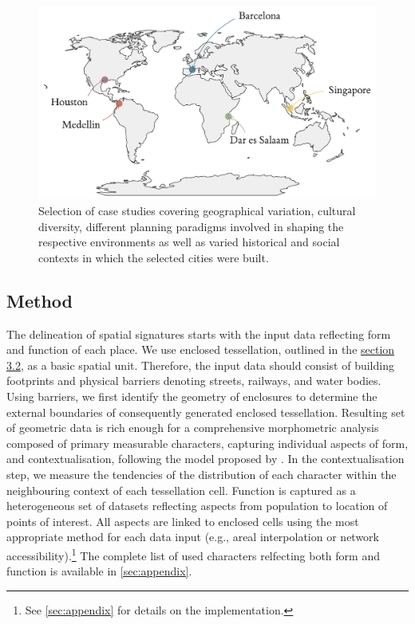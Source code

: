 \begin{figure}
    \includegraphics[width=0.75\linewidth, center]{figures/examples_map.pdf}
    \caption{Selection of case studies covering geographical variation,
    cultural diversity, different planning paradigms involved in shaping the
    respective environments as well as varied historical and social contexts in which the
    selected cities were built.}
    \label{fig:world_map}
\end{figure}

\subsection{Method}



The delineation of spatial signatures starts with the input data reflecting form and
function of each place. We use enclosed tessellation, outlined in the
\hyperref[sec:ssec:ss_et]{section 3.2}, as a basic spatial unit. Therefore, the input
data should consist of building footprints and physical barriers denoting streets,
railways, and water bodies.
Using barriers, we first identify the geometry of enclosures to determine the external
boundaries of consequently generated enclosed tessellation.
Resulting set of geometric data is rich enough for a comprehensive morphometric analysis
composed of primary measurable characters, capturing individual aspects of form, and
contextualisation, following the model proposed by
\citealp{fleischmann2021methodological}. In the contextualisation step, we measure the
tendencies of the distribution of each character within the neighbouring context of each
tessellation cell.
Function is captured as a heterogeneous set of datasets reflecting aspects from
population to location of points of interest. All aspects are linked to enclosed cells
using the most appropriate method for each data input (e.g., areal interpolation or
network accessibility).\footnote{See \ref{sec:appendix} for details on the
implementation.} The complete list of used characters relfecting both form and function
is available in \ref{sec:appendix}.

